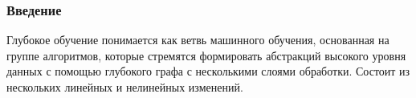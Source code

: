\begin{frame}
    \frametitle{Введение}

    Глубокое обучение понимается как ветвь машинного обучения, основанная на группе алгоритмов,
    которые стремятся формировать абстракций высокого уровня
    данных с помощью глубокого графа с несколькими слоями обработки.
    Состоит из нескольких линейных и нелинейных изменений.

\end{frame}